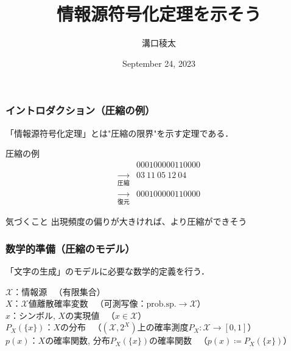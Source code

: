 \documentclass{classes/myslide}
\title{情報源符号化定理を示そう}
\author{溝口稜太}
\institute{創域理工学部情報計算科学科４年}
\date{September 24, 2023}
\begin{document}
\begin{frame}
  \titlepage
\end{frame}

\begin{frame}\frametitle{イントロダクション（圧縮の例）}

  「情報源符号化定理」とは"圧縮の限界"を示す定理である．

  \begin{exampleblock}{圧縮の例}
    \begin{align*}
      &000100000110000 \\
      \xrightarrow[圧縮]{} & 03 \ 11 \ 05 \ 12 \ 04 \\
      \xrightarrow[復元]{} & 000100000110000 
    \end{align*}
  \end{exampleblock}

  \begin{alertblock}{気づくこと}
    出現頻度の偏りが大きければ、より圧縮ができそう
  \end{alertblock}

\end{frame}

\begin{frame}\frametitle{数学的準備（圧縮のモデル）}
  「文字の生成」のモデルに必要な数学的定義を行う．
  \begin{definition}[情報源など]
    $\mathcal{X}$：情報源 \ （有限集合）\\
    $X$：$\mathcal{X}$値離散確率変数 \ （可測写像：$\mathrm{prob. sp.} \rightarrow \mathcal{X}$）\\
    $x$：シンボル, $X$の実現値 \ （$ x \in \mathcal{X}$） \\
    $P_X(\{x\})$：$X$の分布 \ （$(\mathcal{X}, 2^{X})$上の確率測度$P_X: \mathcal{X} \rightarrow [0, 1]$） \\
    $p(x)$：$X$の確率関数, 分布$P_X(\{x\})$の確率関数 \ （$p(x) \coloneq P_X(\{x\})$）
  \end{definition}
\end{frame}
\end{document}
